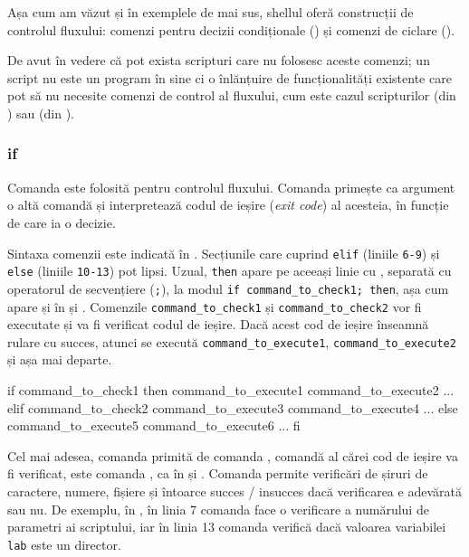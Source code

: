 Așa cum am văzut și în exemplele de mai sus, shellul oferă construcții de
controlul fluxului: comenzi pentru decizii condiționale () și comenzi de
ciclare ().

De avut în vedere că pot exista scripturi care nu folosesc
aceste comenzi; un script nu este un program în sine ci o înlănțuire de
funcționalități existente care pot să nu necesite comenzi de control al
fluxului, cum este cazul scripturilor  (din ) sau  (din ).

\subsubsection{if}
\label{sec:auto:script-func:flow-control:if}

Comanda  este folosită pentru controlul fluxului.
Comanda primește ca argument o altă comandă și interpretează codul de ieșire (\textit{exit code}) al acesteia, în funcție de care ia o decizie.

Sintaxa comenzii  este indicată în .
Secțiunile care cuprind \texttt{elif} (liniile \texttt{6-9}) și \texttt{else} (liniile \texttt{10-13}) pot lipsi.
Uzual, \texttt{then} apare pe aceeași linie cu , separată cu operatorul de secvențiere (\texttt{;}), la modul \texttt{if command\_to\_check1; then}, așa cum apare și în  și .
Comenzile \texttt{command\_to\_check1} și \texttt{command\_to\_check2} vor fi executate și va fi verificat codul de ieșire.
Dacă acest cod de ieșire înseamnă rulare cu succes, atunci se execută \texttt{command\_to\_execute1}, \texttt{command\_to\_execute2} și așa mai departe.

\begin{screen}[caption={Sintaxa comenzii if},label={lst:auto:if-syntax}]
if command_to_check1
then
    command_to_execute1
    command_to_execute2
    ...
elif command_to_check2
    command_to_execute3
    command_to_execute4
    ...
else
    command_to_execute5
    command_to_execute6
    ...
fi
\end{screen}

Cel mai adesea, comanda primită de comanda , comandă al cărei cod de ieșire va fi verificat, este comanda , ca în  și .
Comanda  permite verificări de șiruri de caractere, numere, fișiere și întoarce succes / insucces dacă verificarea e adevărată sau nu.
De exemplu, în , în linia 7 comanda  face o verificare a numărului de parametri ai scriptului, iar în linia 13 comanda  verifică dacă valoarea variabilei \texttt{lab} este un director.

